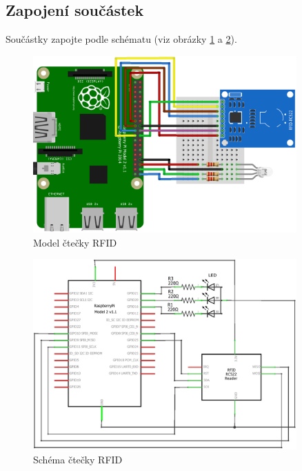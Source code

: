 \documentclass[czech,BP]{thesiskiv}
\begin{document}
\subsection{Zapojení součástek}

Součástky zapojte podle schématu (viz obrázky \ref{fig:reader_rfid_diagram_bb} a \ref{fig:reader_rfid_diagram_schem}).

\begin{figure}[H]
	\centering
	\includegraphics[width=0.9\textwidth]{../diagrams/reader_rfid_diagram_bb.png}	
	\caption{Model čtečky RFID}
	\label{fig:reader_rfid_diagram_bb}
\end{figure}	
	
\begin{figure}[H]
	\centering
	\includegraphics[width=0.9\textwidth]{../diagrams/reader_rfid_diagram_schem.png}	
	\caption{Schéma čtečky RFID}
	\label{fig:reader_rfid_diagram_schem}
\end{figure}
\end{document}
